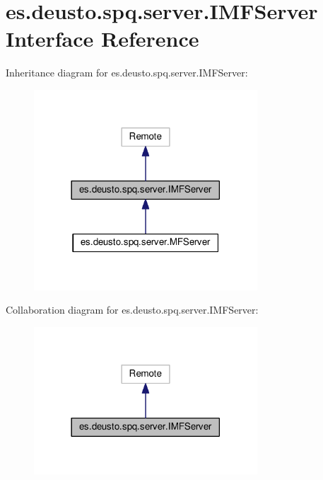 \hypertarget{interfacees_1_1deusto_1_1spq_1_1server_1_1_i_m_f_server}{}\section{es.\+deusto.\+spq.\+server.\+I\+M\+F\+Server Interface Reference}
\label{interfacees_1_1deusto_1_1spq_1_1server_1_1_i_m_f_server}


Inheritance diagram for es.\+deusto.\+spq.\+server.\+I\+M\+F\+Server\+:\nopagebreak
\begin{figure}[H]
\begin{center}
\leavevmode
\includegraphics[width=237pt]{interfacees_1_1deusto_1_1spq_1_1server_1_1_i_m_f_server__inherit__graph}
\end{center}
\end{figure}


Collaboration diagram for es.\+deusto.\+spq.\+server.\+I\+M\+F\+Server\+:\nopagebreak
\begin{figure}[H]
\begin{center}
\leavevmode
\includegraphics[width=237pt]{interfacees_1_1deusto_1_1spq_1_1server_1_1_i_m_f_server__coll__graph}
\end{center}
\end{figure}

